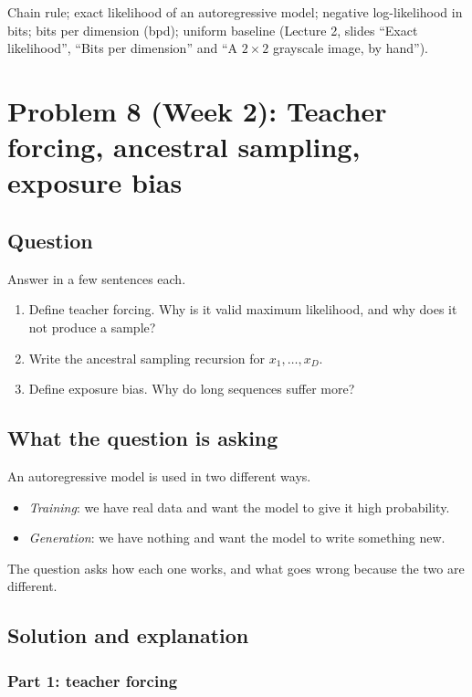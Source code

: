 \documentclass[12pt,a4paper]{article}
\begin{document}
Chain rule; exact likelihood of an autoregressive model; negative log-likelihood in bits; bits per dimension (bpd); uniform baseline (Lecture 2, slides ``Exact likelihood'', ``Bits per dimension'' and ``A $2\times2$ grayscale image, by hand'').

\section{Problem 8 (Week 2): Teacher forcing, ancestral sampling, exposure bias}

\subsection{Question}

Answer in a few sentences each.

\begin{enumerate}[leftmargin=*]
\item Define teacher forcing. Why is it valid maximum likelihood, and why does it not produce a sample?
\item Write the ancestral sampling recursion for $x_1, \ldots, x_D$.
\item Define exposure bias. Why do long sequences suffer more?
\end{enumerate}

\subsection{What the question is asking}

An autoregressive model is used in two different ways.
\begin{itemize}[leftmargin=*]
\item \emph{Training}: we have real data and want the model to give it high probability.
\item \emph{Generation}: we have nothing and want the model to write something new.
\end{itemize}
The question asks how each one works, and what goes wrong because the two are different.

\subsection{Solution and explanation}

\subsubsection{Part 1: teacher forcing}
\end{document}
